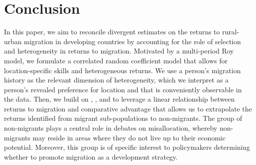 \documentclass[12pt]{article}
\begin{document}



\FloatBarrier


\section{Conclusion}\label{sec:conclusion}

In this paper, we aim to reconcile divergent estimates on the returns to rural-urban migration in developing countries by accounting for the role of selection and heterogeneity in returns to migration. Motivated by a multi-period Roy model, we formulate a correlated random coefficient model that allows for location-specific skills and heterogeneous returns.  
We use a person’s migration history as the relevant dimension of heterogeneity, which we interpret as a person’s revealed preference for location and that is conveniently observable in the data. 
Then, we build on \cite{suriSelectionComparativeAdvantage2011}, 
\cite{lemieuxEstimatingEffectsUnions1998}, and   \cite{tjernstromCommentSuri2011} to leverage a linear relationship between returns to migration and comparative advantage that allows us to extrapolate the returns identified from migrant sub-populations to non-migrants.
The group of non-migrants plays a central role in debates on misallocation, whereby non-migrants may reside in areas where they do not live up to their economic potential. 
Moreover, this group is of specific interest to policymakers determining whether to promote migration as a development strategy.
\end{document}

